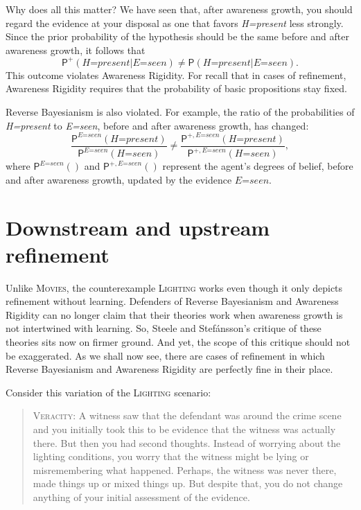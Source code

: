 \documentclass[
  11pt,
  dvipsnames,enabledeprecatedfontcommands]{scrartcl}
\newcommand{\pr}[1]{\ensuremath{\mathsf{P}(#1)}}
\newcommand{\ppr}[2]{\ensuremath{\mathsf{P}^{#1}(#2)}}
\begin{document}
Why does all this matter? We have seen that, after awareness growth, you
should regard the evidence at your disposal as one that favors
\textit{H=present} less strongly. Since the prior probability of the
hypothesis should be the same before and after awareness growth, it
follows that
\[\ppr{+}{\textit{H=present} \vert \textit{E=seen}} \neq \pr{\textit{H=present} \vert \textit{E=seen}}.\]
This outcome violates Awareness Rigidity. For recall that in cases of
refinement, Awareness Rigidity requires that the probability of basic
propositions stay fixed.

Reverse Bayesianism is also violated. For example, the ratio of the
probabilities of \textit{H=present} to \textit{E=seen}, before and after
awareness growth, has changed:
\[\frac{\ppr{\textit{E=seen}}{\textit{H=present}}}{\ppr{ \textit{E=seen}}{\textit{H=seen}}} \neq \frac{\ppr{+, \textit{E=seen}}{\textit{H=present}}}{\ppr{+, \textit{E=seen}}{\textit{H=seen}}},\]
where \(\ppr{\textit{E=seen}}{}\) and \(\ppr{+, \textit{E=seen}}{}\)
represent the agent's degrees of belief, before and after awareness
growth, updated by the evidence \(\textit{E=seen}\).

\hypertarget{downstream-and-upstream-refinement}{%
\section{Downstream and upstream
refinement}\label{downstream-and-upstream-refinement}}

\label{sec:downstream}

Unlike \textsc{Movies}, the counterexample \textsc{Lighting} works even
though it only depicts refinement without learning. Defenders of Reverse
Bayesianism and Awareness Rigidity can no longer claim that their
theories work when awareness growth is not intertwined with learning.
So, Steele and Stefánsson's critique of these theories sits now on
firmer ground. And yet, the scope of this critique should not be
exaggerated. As we shall now see, there are cases of refinement in which
Reverse Bayesianism and Awareness Rigidity are perfectly fine in their
place.

Consider this variation of the \textsc{Lighting} scenario:

\begin{quote}
\textsc{Veracity}: A witness saw that the defendant was around the crime
scene and you initially took this to be evidence that the witness was
actually there. But then you had second thoughts. Instead of worrying
about the lighting conditions, you worry that the witness might be lying
or misremembering what happened. Perhaps, the witness was never there,
made things up or mixed things up. But despite that, you do not change
anything of your initial assessment of the evidence.
\end{quote}
\end{document}
